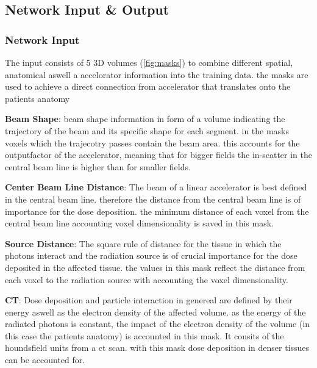 \subsection{Network Input \& Output}



\subsubsection{Network Input}

The input consists of 5 3D volumes (\autoref{fig:masks}) to combine different spatial, anatomical aswell a accelorator information into the training data. the masks are used to achieve a direct connection from accelerator that translates onto the patients anatomy

\setlength{\hangingindent}{1em}
\begin{hangingpar}
    \item \textbf{Beam Shape}: beam shape information in form of a volume indicating the trajectory of the beam and its specific shape for each segment. in the masks voxels which the trajecotry passes contain the beam area. this accounts for the outputfactor of the accelerator, meaning that for bigger fields the in-scatter in the central beam line is higher than for smaller fields. 
\end{hangingpar}
\begin{hangingpar}
    \item \textbf{Center Beam Line Distance}: The beam of a linear accelerator is best defined in the central beam line. therefore the distance from the central beam line is of importance for the dose deposition. the minimum distance of each voxel from the central beam line accounting voxel dimensionality is saved in this mask.
\end{hangingpar}
\begin{hangingpar}
    \item \textbf{Source Distance}: The square rule of distance for the tissue in which the photons interact and the radiation source is of crucial importance for the dose deposited in the affected tissue. the values in this mask reflect the distance from each voxel to the radiation source with accounting the voxel dimensionality. 
\end{hangingpar}
\begin{hangingpar}
    \item \textbf{CT}: Dose deposition and particle interaction in genereal are defined by their energy aswell as the electron density of the affected volume. as the energy of the radiated photons is constant, the impact of the electron density of the volume (in this case the patients anatomy) is accounted in this mask. It consits of the houndsfield units from a ct scan. with this mask dose deposition in denser tissues can be accounted for.
\end{hangingpar}
